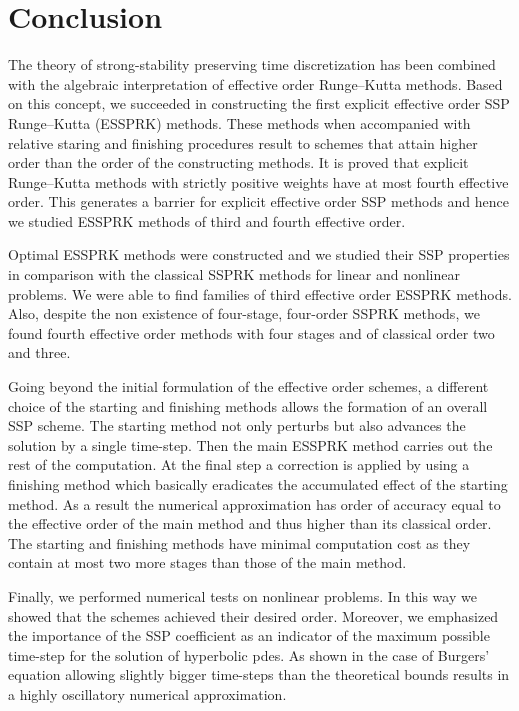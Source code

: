 \section{Conclusion}\label{sec:Conclusion}
The theory of strong-stability preserving time discretization has been 
combined with the algebraic interpretation of effective order Runge--Kutta 
methods. 
Based on this concept, we succeeded in constructing the first explicit 
effective order SSP Runge--Kutta (ESSPRK) methods. 
These methods when accompanied with relative staring and finishing 
procedures result to schemes that attain higher order than the order of 
the constructing methods. 
It is proved that explicit Runge--Kutta methods with strictly positive 
weights have at most fourth effective order. 
This generates a barrier for explicit effective order SSP methods and 
hence we studied ESSPRK methods of third and fourth effective order.

Optimal ESSPRK methods were constructed and we studied their SSP 
properties in comparison with the classical SSPRK methods for linear and 
nonlinear problems. 
We were able to find families of third effective order ESSPRK methods. 
Also, despite the non existence of four-stage, four-order SSPRK methods, 
we found fourth effective order methods with four stages and of classical 
order two and three. 

Going beyond the initial formulation of the effective order schemes, a 
different choice of the starting and finishing methods allows the 
formation of an overall SSP scheme. 
The starting method not only perturbs but also advances the solution by 
a single time-step.  
Then the main ESSPRK method carries out the rest of the computation. 
At the final step a correction is applied by using a finishing method which 
basically eradicates the accumulated effect of the starting method. 
As a result the numerical approximation has order of accuracy equal to 
the effective order of the main method and thus higher than its classical 
order. 
The starting and finishing methods have minimal computation cost as 
they contain at most two more stages than those of the main method.

Finally, we performed numerical tests on nonlinear problems. In this way 
we showed that the schemes achieved their desired order. 
Moreover, we emphasized the importance of the SSP coefficient as an 
indicator of the maximum possible time-step for the solution of 
hyperbolic pdes. 
As shown in the case of Burgers' equation allowing slightly bigger time-steps 
than the theoretical bounds results in a highly oscillatory numerical 
approximation.  

